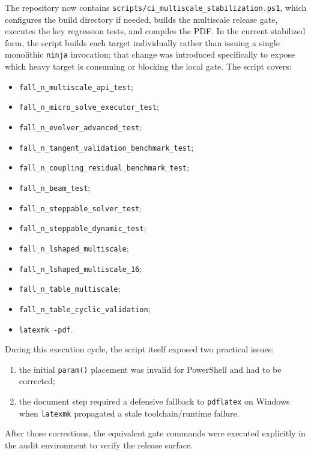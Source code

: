 The repository now contains
\texttt{scripts/ci\_multiscale\_stabilization.ps1}, which configures the build
directory if needed, builds the multiscale release gate, executes the key
regression tests, and compiles the PDF.  In the current stabilized form, the
script builds each target individually rather than issuing a single monolithic
\texttt{ninja} invocation; that change was introduced specifically to expose
which heavy target is consuming or blocking the local gate.  The script covers:
\begin{itemize}
  \item \texttt{fall\_n\_multiscale\_api\_test};
  \item \texttt{fall\_n\_micro\_solve\_executor\_test};
  \item \texttt{fall\_n\_evolver\_advanced\_test};
  \item \texttt{fall\_n\_tangent\_validation\_benchmark\_test};
  \item \texttt{fall\_n\_coupling\_residual\_benchmark\_test};
  \item \texttt{fall\_n\_beam\_test};
  \item \texttt{fall\_n\_steppable\_solver\_test};
  \item \texttt{fall\_n\_steppable\_dynamic\_test};
  \item \texttt{fall\_n\_lshaped\_multiscale};
  \item \texttt{fall\_n\_lshaped\_multiscale\_16};
  \item \texttt{fall\_n\_table\_multiscale};
  \item \texttt{fall\_n\_table\_cyclic\_validation};
  \item \texttt{latexmk -pdf}.
\end{itemize}

During this execution cycle, the script itself exposed two practical issues:
\begin{enumerate}
  \item the initial \texttt{param()} placement was invalid for PowerShell and
    had to be corrected;
  \item the document step required a defensive fallback to
    \texttt{pdflatex} on Windows when \texttt{latexmk} propagated a stale
    toolchain/runtime failure.
\end{enumerate}
After those corrections, the equivalent gate commands were executed explicitly
in the audit environment to verify the release surface.

